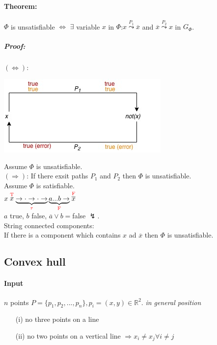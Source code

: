 \paragraph{Theorem:} $\Phi$ is unsatisfiable $\Leftrightarrow$ $\exists$ variable $x$ in $\Phi$:$x \stackrel{P_1}{\leadsto} \overline{x}$ and $\overline{x} \stackrel{P_2}{\leadsto}x$ in $G_{\Phi}$.
\subparagraph{Proof:} $(\Leftrightarrow)$: 
\begin{center}
	\includegraphics[scale=0.75]{img/proof422}
\end{center}
Assume $\Phi$ is unsatisfiable. \\
$(\Rightarrow)$: If there exsit paths $P_1$ and $P_2$ then $\Phi$ is unsatisfiable. \\
Assume $\Phi$ is satisfiable. \\
$x\stackrel{\text{\textcolor{red}{T}}}{x} \underbrace{\rightarrow \cdot \rightarrow \cdot \rightarrow}_{\text{\textcolor{red}{$\tau$}}} \underbrace{a ... b \rightarrow}_{\text{\textcolor{red}{F}}} \stackrel{\text{\textcolor{red}{F}}}{\overline{x}}$ \\
$a$ true, $b$ false, $\overline{a} \lor b = $false $\lightning$. \\
String connected components: \\
If there is a component which contains $x$ ad $\overline{x}$ then $\Phi$ is unsatisfiable.

\subsection{Convex hull}
\paragraph{Input} $n$ points $P = \{p_1,p_2,...,p_n\}, p_i = (x,y) \in \mathbb{R}^2$. \textit{in general position}
\begin{itemize}
	\item[(i)] no three points on a line
	\item[(ii)] no two points on a vertical line $\Rightarrow x_i \neq x_j \forall i \neq j$
\end{itemize}
